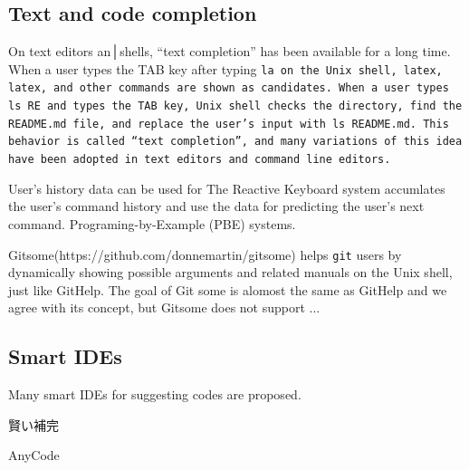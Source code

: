 \documentclass{sigchi}
\def\GH{\textsf{GitHelp}}
\begin{document}
\subsection{Text and code completion}

On text editors an│shells,
``text completion'' has been available for a long time.
%
When a user types the TAB key after typing \tt{la} on the Unix shell,
\tt{latex}, \tt{latex}, and other commands are shown as candidates.
When a user types \tt{ls RE} and types the TAB key,
Unix shell checks the directory, find the \texttt{README.md} file, and
replace the user's input with \tt{ls README.md}.
This behavior is called ``text completion'', and many variations of
this idea have been adopted in text editors and command line editors.

User's history data can be used for 
The Reactive Keyboard system\cite{ReactiveKeyboard}
accumlates the user's command history and use the data
for predicting the user's next command.
Programing-by-Example (PBE) systems\cite{Cypher}\cite{Lieberman}.

Gitsome(https://github.com/donnemartin/gitsome)
helps \texttt{git} users by dynamically
showing possible arguments and related manuals on the Unix shell,
just like {\GH}.
The goal of Git some is alomost the same as {\GH} and we agree with its concept,
but Gitsome does not support ...

\subsection{Smart IDEs}

Many smart IDEs for suggesting codes are proposed.

賢い補完
\cite{Little:2006:TKC:1166253.1166275}

AnyCode\cite{Gvero:2015:SJE:2814270.2814295}
\end{document}
